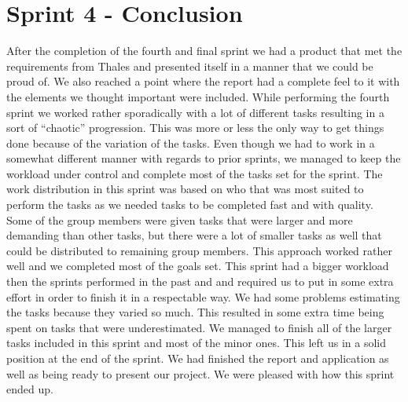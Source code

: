 \section{Sprint 4 - Conclusion}
After the completion of the fourth and final sprint we had a product that met the requirements from Thales and presented itself in a manner that we could be proud of. We also reached a point where the report had a complete feel to it with the elements we thought important were included. 
\newline
While performing the fourth sprint we worked rather sporadically with a lot of different tasks resulting in a sort of “chaotic” progression. This was more or less the only way to get things done because of the variation of the tasks. Even though we had to work in a somewhat different manner with regards to prior sprints, we managed to keep the workload under control and complete most of the tasks set for the sprint. The work distribution in this sprint was based on who that was most suited to perform the tasks as we needed tasks to be completed fast and with quality. Some of the group members were given tasks that were larger and more demanding than other tasks, but there were a lot of smaller tasks as well that could be distributed to remaining group members. This approach worked rather well and we completed most of the goals set.
\newline
This sprint had a bigger workload then the sprints performed in the past and and required us to put in some extra effort in order to finish it in a respectable way. We had some problems estimating the tasks because they varied so much. This resulted in some extra time being spent on tasks that were underestimated. We managed to finish all of the larger tasks included in this sprint and most of the minor ones. This left us in a solid position at the end of the sprint. We had finished the report and application as well as being ready to present our project. We were pleased with how this sprint ended up.    



